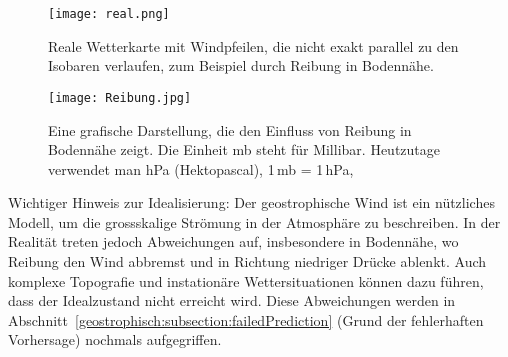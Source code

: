 \begin{figure}
    	\centering
    	\texttt{[image: real.png]}
  	 \caption{Reale Wetterkarte mit Windpfeilen, die nicht exakt parallel zu den Isobaren verlaufen, zum Beispiel durch Reibung in Bodennähe.}
   	\label{bild:real}
\end{figure}

\begin{figure}
    	\centering
    	\texttt{[image: Reibung.jpg]}
  	 \caption{Eine grafische Darstellung, die den Einfluss von Reibung in Bodennähe zeigt. Die Einheit mb steht für Millibar. Heutzutage verwendet man hPa (Hektopascal), 1\,mb = 1\,hPa,}
   	\label{bild:reibung}
\end{figure}


Wichtiger Hinweis zur Idealisierung:
Der geostrophische Wind ist ein nützliches Modell, um die grossskalige Strömung in der Atmosphäre zu beschreiben. In der Realität treten jedoch Abweichungen auf, insbesondere in Bodennähe, wo Reibung den Wind abbremst und in Richtung niedriger Drücke ablenkt. Auch komplexe Topografie und instationäre Wettersituationen können dazu führen, dass der Idealzustand nicht erreicht wird.
%
Diese Abweichungen werden in Abschnitt~\ref{geostrophisch:subsection:failedPrediction} (Grund der fehlerhaften Vorhersage) nochmals aufgegriffen.







